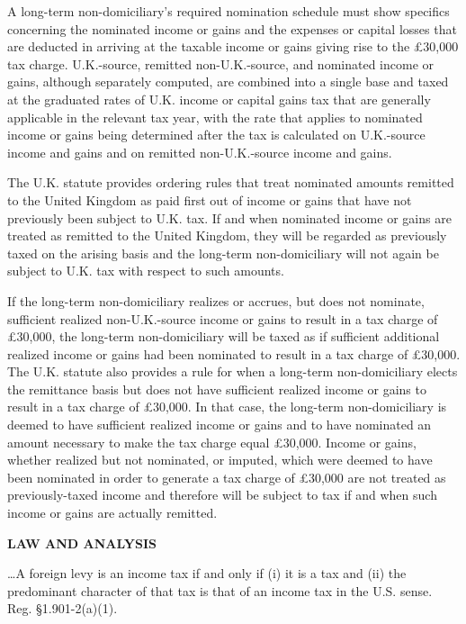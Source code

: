 \begin{select}
A long-term non-domiciliary's required nomination schedule must show specifics concerning the nominated income or gains and the expenses or capital losses that are deducted in arriving at the taxable income or gains giving rise to the \pounds30,000 tax charge. U.K.-source, remitted non-U.K.-source, and nominated income or gains, although separately computed, are combined into a single base and taxed at the graduated rates of U.K. income or capital gains tax that are generally applicable in the relevant tax year, with the rate that applies to nominated income or gains being determined after the tax is calculated on U.K.-source income and gains and on remitted non-U.K.-source income and gains.

The U.K. statute provides ordering rules that treat nominated amounts remitted to the United Kingdom as paid first out of income or gains that have not previously been subject to U.K. tax. If and when nominated income or gains are treated as remitted to the United Kingdom, they will be regarded as previously taxed on the arising basis and the long-term non-domiciliary will not again be subject to U.K. tax with respect to such amounts.

If the long-term non-domiciliary realizes or accrues, but does not nominate, sufficient realized non-U.K.-source income or gains to result in a tax charge of \pounds30,000, the long-term non-domiciliary will be taxed as if sufficient additional realized income or gains had been nominated to result in a tax charge of \pounds30,000. The U.K. statute also provides a rule for when a long-term non-domiciliary elects the remittance basis but does not have sufficient realized income or gains to result in a tax charge of \pounds30,000. In that case, the long-term non-domiciliary is deemed to have sufficient realized income or gains and to have nominated an amount necessary to make the tax charge equal \pounds30,000. Income or gains, whether realized but not nominated, or imputed, which were deemed to have been nominated in order to generate a tax charge of \pounds30,000 are not treated as previously-taxed income and therefore will be subject to tax if and when such income or gains are actually remitted.

\begin{center}
\textbf{LAW AND ANALYSIS}
\end{center}

\ldots A foreign levy is an income tax if and only if (i) it is a tax and (ii) the predominant character of that tax is that of an income tax in the U.S. sense. Reg. \S1.901-2(a)(1).


\end{select}
